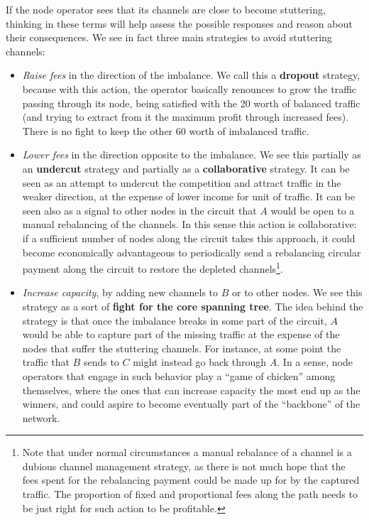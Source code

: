 \documentclass[a4paper]{article}
\begin{document}
If the node operator sees that its channels are close to become stuttering, thinking in these terms will help assess the possible responses and reason about their consequences. We see in fact three main strategies to avoid stuttering channels:
\begin{itemize}
\item \emph{Raise fees} in the direction of the imbalance. We call this a \textbf{dropout} strategy, because with this action, the operator basically renounces to grow the traffic passing through its node, being satisfied with the 20 worth of balanced traffic (and trying to extract from it the maximum profit through increased fees). There is no fight to keep the other 60 worth of imbalanced traffic.

\item \emph{Lower fees} in the direction opposite to the imbalance. We see this partially as an \textbf{undercut} strategy and partially as a \textbf{collaborative} strategy. It can be seen as an attempt to undercut the competition and attract traffic in the weaker direction, at the expense of lower income for unit of traffic. It can be seen also as a signal to other nodes in the circuit that $A$ would be open to a manual rebalancing of the channels. In this sense this action is collaborative: if a sufficient number of nodes along the circuit takes this approach, it could become economically advantageous to periodically send a rebalancing circular payment along the circuit to restore the depleted channels\footnote{Note that under normal circumstances a manual rebalance of a channel is a dubious channel management strategy, as there is not much hope that the fees spent for the rebalancing payment could be made up for by the captured traffic. The proportion of fixed and proportional fees along the path needs to be just right for such action to be profitable.}.

\item \emph{Increase capacity}, by adding new channels to $B$ or to other nodes. We see this strategy as a sort of \textbf{fight for the core spanning tree}. The idea behind the strategy is that once the imbalance breaks in some part of the circuit, $A$ would be able to capture part of the missing traffic at the expense of the nodes that suffer the stuttering channels. For instance, at some point the traffic that $B$ sends to $C$ might instead go back through $A$. In a sense, node operators that engage in such behavior play a ``game of chicken'' among themselves, where the ones that can increase capacity the most end up as the winners, and could aspire to become eventually part of the ``backbone'' of the network.
\end{itemize}
\end{document}
